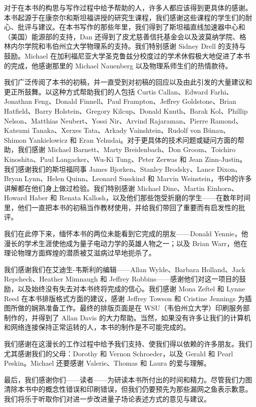 对于在本书的构思与写作过程中给予帮助的人，许多人都应该得到更具体的感谢。本书起源于在康奈尔和斯坦福讲授的研究生课程，我们感谢这些课程的学生们的耐心、批评与建议。在本书写作的那些年里，我们得到了斯坦福直线加速器中心和（美国）能源部的支持，Dan 还得到了皮尤慈善信托基金会以及波莫纳学院、格林内尔学院和韦伯州立大学物理系的支持。我们特别感谢 Sidney Drell 的支持与鼓励。Michael 在加利福尼亚大学圣克鲁兹分校度过的学术休假极大地促进了本书的完成，他感谢那里的 Michael Nauenberg 以及物理系师生们的热情款待。

我们广泛传阅了本书的初稿，并一直受到对初稿的回应以及由此引发的大量建议和更正所鼓舞。以这种方式帮助我们的人包括 Curtis Callan、Edward Farhi、Jonathan Feng、Donald Finnell、Paul Frampton、Jeffrey Goldstone、Brian Hatfield、Barry Holstein、Gregory Kilcup、Donald Knuth、Barak Kol、Phillip Nelson、Matthias Neubert、Yossi Nir、Arvind Rajaraman、Pierre Ramond、Katsumi Tanaka、Xerxes Tata、Arkady Vainshtein、Rudolf von B\"unau、Shimon Yankielowicz 和 Eran Yehudai。对于更具体的技术问题或疑问方面的帮助，我们感谢 Michael Barnett、Marty Breidenbach、Don Groom、Toichiro Kinoshita、Paul Langacker、Wu-Ki Tung、Peter Zerwas 和 Jean Zinn-Justin。我们感谢我们的斯坦福同事 James Bjorken、Stanley Brodsky、Lance Dixon、Bryan Lynn、Helen Quinn、Leonard Susskind 和 Marvin Weinstein，书中的许多讲解都在他们身上做过检验。我们特别感谢 Michael Dine、Martin Einhorn、Howard Haber 和 Renata Kallosh，以及他们那些饱受折磨的学生——在数年时间里，他们一直把本书的初稿当作教材使用，并给我们带回了重要而有启发性的批评。

我们在此停下来，缅怀本书的两位未能看到它完成的朋友——Donald Yennie，他漫长的学术生涯使他成为量子电动力学的英雄人物之一；以及 Brian Warr，他在理论物理方面辉煌的潜质被艾滋病过早地扼杀了。

我们感谢我们在艾迪生-韦斯利的编辑——Allan Wylde、Barbara Holland、Jack Repcheck、Heather Mimnaugh 和 Jeffrey Robbins——感谢他们对这一项目的鼓励，以及始终没有失去对本书终将完成的信心。我们感谢 Mona Zeftel 和 Lynne Reed 在本书排版格式方面的建议，感谢 Jeffrey Towson 和 Cristine Jennings 为插图所做的娴熟准备工作。最终的排版页面是在 WSU（韦伯州立大学）印刷服务部制作的，并得到了 Allan Davis 的大力帮助。当然，如果没有许多让我们的计算机和网络连接保持正常运转的人，本书的制作是不可能完成的。

我们感谢在这漫长的工作过程中给予我们支持、使我们得以依赖的许多朋友。我们尤其感谢我们的父母：Dorothy 和 Vernon Schroeder，以及 Gerald 和 Pearl Peskin。Michael 还要感谢 Valerie、Thomas 和 Laura 的爱与理解。

最后，我们感谢你们——读者——为研读本书所付出的时间和精力。尽管我们力图清除本书中的概念性错误和印刷错误，但我们仍要预先为那些漏网之鱼表示歉意。我们将乐于听取你们对进一步改进量子场论表述方式的意见与建议。


